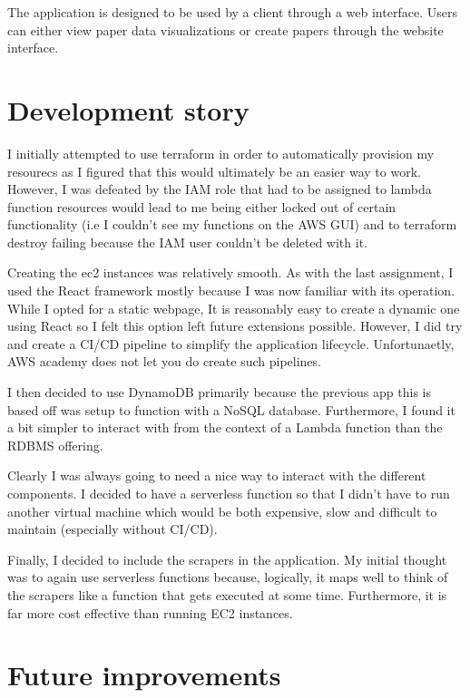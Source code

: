 \documentclass[12pt]{article}
\begin{document}
The application is designed to be used by a client through a web interface. Users can either view paper data visualizations or create papers through the website interface. 


\section{Development story}

I initially attempted to use terraform in order to automatically provision my resourecs as I figured that this would ultimately be an easier way to work.
However, I was defeated by the IAM role that had to be assigned to lambda function resources would lead to me being either locked out of certain functionality (i.e I couldn't see my functions on the AWS GUI) and to terraform destroy failing because the IAM user couldn't be deleted with it.

Creating the ec2 instances was relatively smooth. As with the last assignment, I used the React framework mostly because I was now familiar with its operation. While I opted for a static webpage, It is reasonably easy to create a dynamic one using React so I felt this option left future extensions possible.
However, I did try and create a CI/CD pipeline to simplify the application lifecycle. Unfortunaetly, AWS academy does not let you do create such pipelines.

I then decided to use DynamoDB primarily because the previous app this is based off was setup to function with a NoSQL database. Furthermore, I found it a bit simpler to interact with from the context of a Lambda function than the RDBMS offering.

Clearly I was always going to need a nice way to interact with the different components. I decided to have a serverless function so that I didn't have to run another virtual machine which would be both expensive, slow and difficult to maintain (especially without CI/CD).

Finally, I decided to include the scrapers in the application. My initial thought was to again use serverless functions because, logically, it maps well to think of the scrapers like a function that gets executed at some time. Furthermore, it is far more cost effective than running EC2 instances.


\section{Future improvements}
\end{document}
